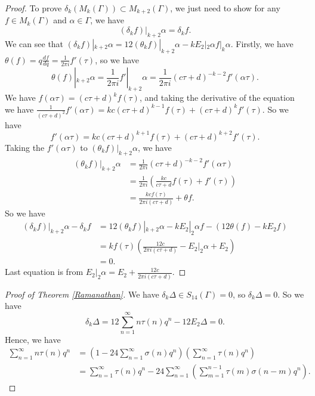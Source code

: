 \documentclass{article}
\begin{document}
\begin{proof}
    To prove $\delta_k(M_k(\Gamma))\subset M_{k+2}(\Gamma)$, we just need to show for any $f\in M_k(\Gamma)$ and $\alpha\in \Gamma$, we have 
    \begin{equation}\label{*}
        (\delta_kf)|_{k+2}\alpha=\delta_kf.
    \end{equation}
    We can see that $(\delta_kf)|_{k+2}\alpha=12(\theta_kf)|_{k+2}\alpha-kE_2|_2\alpha f|_k\alpha$. Firstly, we have $\theta (f)=q\frac{df}{dq}=\frac{1}{2\pi i}f'(\tau)$, so we have 
    \[\theta (f)|_{k+2}\alpha=\frac{1}{2\pi i}f'|_{k+2}\alpha=\frac{1}{2\pi i}(c\tau+d)^{-k-2}f'(\alpha\tau).\]
    We have $f(\alpha\tau)=(c\tau+d)^{k}f(\tau)$, and taking the derivative of the equation we have $\frac{1}{(c\tau+d)^2}f'(\alpha\tau)=kc(c\tau+d)^{k-1}f(\tau)+(c\tau+d)^kf'(\tau)$. So we have 
    \[f'(\alpha\tau)=kc(c\tau+d)^{k+1}f(\tau)+(c\tau+d)^{k+2}f'(\tau).\]
    Taking the $f'(\alpha\tau)$ to $(\theta_kf)|_{k+2}\alpha$, we have 
    \begin{equation*}
        \begin{aligned}
            (\theta_kf)|_{k+2}\alpha&=\frac{1}{2\pi i}(c\tau+d)^{-k-2}f'(\alpha\tau)\\
            &=\frac{1}{2\pi i}\left(\frac{kc}{c\tau+d}f(\tau)+f'(\tau)\right)\\
            &=\frac{kcf(\tau)}{2\pi i(c\tau+d)}+\theta f.
        \end{aligned}
    \end{equation*}
    So we have 
    \begin{equation*}
        \begin{aligned}
            (\delta_kf)|_{k+2}\alpha-\delta_kf&=12(\theta_kf)|_{k+2}\alpha-kE_2|_2\alpha f-\left(12\theta (f)-kE_2f\right)\\
            &=kf(\tau)\left(\frac{12c}{2\pi i(c\tau+d)}-E_2|_2\alpha+E_2\right)\\
            &=0.
        \end{aligned}
    \end{equation*}
    Last equation is from $E_2|_2\alpha=E_2+\frac{12c}{2\pi i(c\tau+d)}$.
\end{proof}
\begin{proof}[Proof of Theorem \ref{Ramanathan}]
    We have $\delta_k\Delta\in S_{14}(\Gamma)=0$, so $\delta_k\Delta=0$. So we have 
    \[\delta_k\Delta=12\sum_{n=1}^{\infty}n\tau(n)q^n-12E_2\Delta=0.\]
    Hence, we have
    \begin{equation*}
        \begin{aligned}
            \sum_{n=1}^{\infty}n\tau(n)q^n&=\left(1-24\sum_{n=1}^{\infty}\sigma(n)q^n\right)\left(\sum_{n=1}^{\infty}\tau(n)q^n\right)\\
            &=\sum_{n=1}^{\infty}\tau(n)q^n-24\sum_{n=1}^{\infty}\left(\sum_{m=1}^{n-1}\tau(m)\sigma(n-m)q^n\right).
        \end{aligned}
    \end{equation*}
\end{proof}
\end{document}
